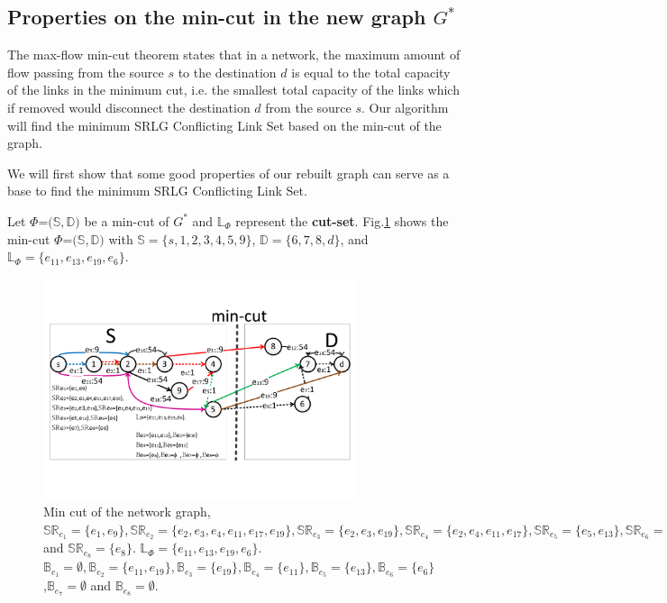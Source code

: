 \subsection{Properties on the min-cut in the new graph $G^*$}
\label{subsec:Properties on the min-cut in the new graph $G^*$}
The max-flow min-cut theorem states that in a  network, the maximum amount of flow passing from the source $s$ to the destination $d$ is equal to the total capacity of the links in the minimum cut, i.e. the smallest total capacity of the links which if removed would disconnect the destination $d$ from the source $s$.  Our algorithm will find the minimum SRLG Conflicting Link Set based on the min-cut of the graph.

We will first show that some good properties of our rebuilt graph can serve as a base to find the minimum SRLG Conflicting Link Set.


Let $\Phi$=${(\mathbb{S}},{\mathbb{D}})$ be a min-cut of $G^*$ and $\mathbb{L}_{\Phi}$  represent the \textbf{cut-set}. Fig.\ref{fig:MinCutStarGraph} shows the min-cut $\Phi$=${(\mathbb{S}},{\mathbb{D}})$ with ${\mathbb{S}}=\{s, 1, 2, 3, 4, 5, 9\}$,  ${\mathbb{D}}=\{6, 7, 8, d\}$, and $\mathbb{L}_{\Phi}=\{e_{11}, e_{13}, e_{19}, e_6\}$.



\begin{figure}[tp]
  \centering
  \includegraphics[width=3.6in]{franz/MinCutStarGraph}
  \caption{Min cut of the network graph, $\mathbb{SR}_{e_1}=\{e_1, e_9\},\mathbb{SR}_{e_2}=\{e_2,e_3,e_4, e_{11},e_{17},e_{19}\},\mathbb{SR}_{e_3}=\{e_2,e_3, e_{19}\},\mathbb{SR}_{e_4}=\{e_2,e_4, e_{11},e_{17}\},\mathbb{SR}_{e_5}=\{e_5, e_{13}\},\mathbb{SR}_{e_6}=\{e_6\},\mathbb{SR}_{e_7}=\{e_7\} $ and $\mathbb{SR}_{e_8}=\{e_8\}$. $\mathbb{L}_{\Phi}=\{e_{11},e_{13},e_{19},e_{6}\}$. $\mathbb{B}_{e_1}=\emptyset,\mathbb{B}_{e_2}=\{e_{11},e_{19}\},\mathbb{B}_{e_3}=\{e_{19}\},\mathbb{B}_{e_4}=\{e_{11}\},\mathbb{B}_{e_5}=\{e_{13}\},\mathbb{B}_{e_6}=\{e_6\}$,$\mathbb{B}_{e_7}=\emptyset$ and $\mathbb{B}_{e_8}=\emptyset$.}\label{fig:MinCutStarGraph}
  \label{fig:MinCutStarGraph}
\end{figure}

